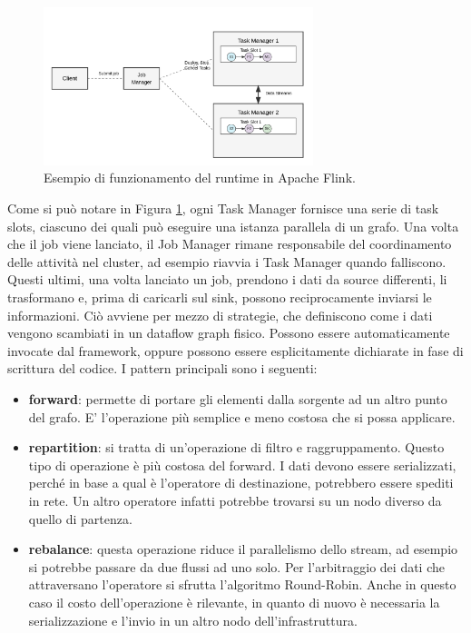 \begin{figure}[htbp]
    \centering
    \includegraphics[width=0.7\textwidth]{figures/flink-architecture-simple-final.png}
    \caption{Esempio di funzionamento del runtime in Apache Flink.}
    \label{fig:flink-arch}
\end{figure}

Come si può notare in Figura \ref{fig:flink-arch}, ogni Task Manager fornisce una serie di task slots, ciascuno dei quali può eseguire una istanza parallela di un grafo. Una volta che il job viene lanciato, il Job Manager rimane responsabile del coordinamento delle attività nel cluster, ad esempio riavvia i Task Manager quando falliscono. Questi ultimi, una volta lanciato un job, prendono i dati da source differenti, li trasformano e, prima di caricarli sul sink, possono reciprocamente inviarsi le informazioni. 
Ciò avviene per mezzo di strategie, che definiscono come i dati vengono scambiati in un dataflow graph fisico. Possono essere automaticamente invocate dal framework, oppure possono essere esplicitamente dichiarate in fase di scrittura del codice. I pattern principali sono i seguenti:

\begin{itemize}
	\item \textbf{forward}: permette di portare gli elementi dalla sorgente ad un altro punto del grafo. E' l'operazione più semplice e meno costosa che si possa applicare.
	\item \textbf{repartition}: si tratta di un'operazione di filtro e raggruppamento. Questo tipo di operazione è più costosa del forward. I dati devono essere serializzati, perché in base a qual è l'operatore di destinazione, potrebbero essere spediti in rete. Un altro operatore infatti potrebbe trovarsi su un nodo diverso da quello di partenza.
	\item \textbf{rebalance}: questa operazione riduce il parallelismo dello stream, ad esempio si potrebbe passare da due flussi ad uno solo. Per l'arbitraggio dei dati che attraversano l'operatore si sfrutta l'algoritmo Round-Robin. Anche in questo caso il costo dell'operazione è rilevante, in quanto di nuovo è necessaria la serializzazione e l'invio in un altro nodo dell'infrastruttura.
\end{itemize}  

